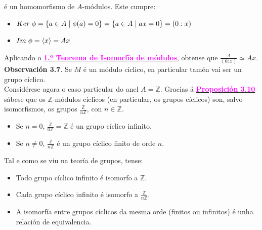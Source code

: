 \documentclass[twoside]{report}
\newcommand{\magbf}[1]{\textcolor{magenta}{\textbf{#1}}} %
\theoremstyle{mystyle}
\begin{document}
\noindent é un homomorfismo de $A$-módulos. Este cumpre:

\begin{itemize}
    \item $Ker \hspace{1mm} \phi = \{a \in A \hspace{1mm} | \hspace{1mm} \phi(a) = 0\} = \{a \in A \hspace{1mm} | \hspace{1mm} ax = 0\} = (0 : x)$
    \item $Im \hspace{1mm} \phi = \langle x \rangle = Ax$
\end{itemize}

\noindent Aplicando o \hyperref[th3.1]{\magbf{1.º Teorema de Isomorfía de módulos}}, obtense que $\displaystyle \frac{A}{(0 : x)} \simeq Ax$.\\

\noindent \textbf{Observación 3.7}. Se $M$ é un módulo cíclico, en particular tamén vai ser un grupo cíclico.\\

\noindent Considérese agora o caso particular do anel $A = \mathbb{Z}$. Gracias á \hyperref[prop3.10]{\magbf{Proposición 3.10}} sábese que os $\mathbb{Z}$-módulos cíclicos (en particular, os grupos cíclicos) son, salvo isomorfismos, os grupos $\displaystyle \frac{\mathbb{Z}}{n\mathbb{Z}}$, con $n \in \mathbb{Z}$.
\begin{itemize}
    \item Se $n = 0$, $\displaystyle \frac{\mathbb{Z}}{0\mathbb{Z}} = \mathbb{Z}$ é un grupo cíclico infinito.
    \item Se $n \neq 0$, $\displaystyle \frac{\mathbb{Z}}{n\mathbb{Z}}$ é un grupo cíclico finito de orde $n$.
\end{itemize}

\noindent Tal e como se viu na teoría de grupos, tense:

\begin{itemize}
    \item Todo grupo cíclico infinito é isomorfo a $\mathbb{Z}$.
    \item Cada grupo cíclico infinito é isomorfo a $\displaystyle \frac{\mathbb{Z}}{n\mathbb{Z}}$.
    \item A isomorfía entre grupos cíclicos da mesma orde (finitos ou infinitos) é unha relación de equivalencia.
\end{itemize}
\end{document}
